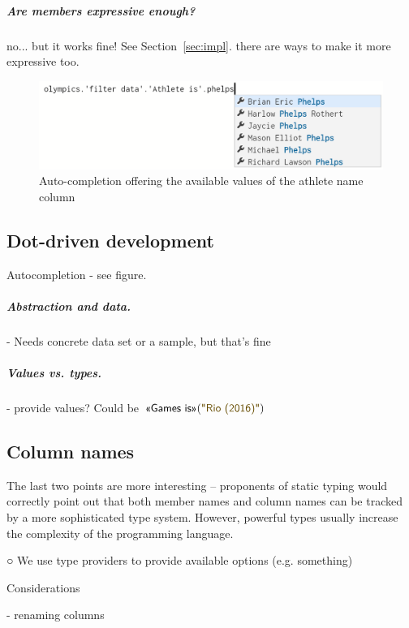 \documentclass[a4paper,UKenglish]{lipics-v2016}
\newcommand{\str}[1]{\textnormal{\textcolor{strclr}{\sffamily "#1"}}}
\newcommand{\qident}[1]{\textnormal{\sffamily \guillemotleft #1\guillemotright}}
\begin{document}
\subparagraph{Are members expressive enough?}

no... but it works fine! See Section~\ref{sec:impl}.
   there are ways to make it more expressive too.
  
\begin{figure}
\begin{center}
\includegraphics[scale=0.35,trim=0mm 0mm 0mm 0mm,clip]{filter.png} %
\end{center}
\vspace{-0.5em}
\caption{Auto-completion offering the available values of the athlete name column}
\label{fig:subtyping-diagram}
\end{figure}
  
\subsection{Dot-driven development}
\label{sec:analysis-auto}

Autocompletion - see figure.

\subparagraph{Abstraction and data.}

- Needs concrete data set or a sample, but that's fine

\subparagraph{Values vs. types.}

- provide values? Could be $\qident{Games is}(\str{Rio (2016)})$



\subsection{Column names}
\label{sec:analysis-col}


The last two points are more interesting -- proponents of static typing would correctly
point out that both member names and column names can be tracked by a more sophisticated type
system. However, powerful types usually increase the complexity of the programming language.

  ○ We use type providers to provide available options
  (e.g. something)

Considerations

 - renaming columns
   
\end{document}
